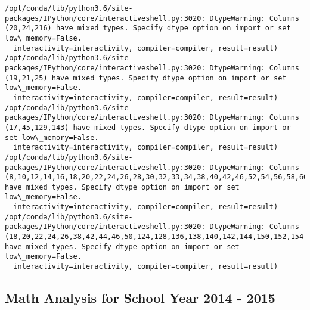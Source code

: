 \documentclass[11pt]{article}
\begin{document}
    \begin{Verbatim}[commandchars=\\\{\}]
/opt/conda/lib/python3.6/site-packages/IPython/core/interactiveshell.py:3020: DtypeWarning: Columns (20,24,216) have mixed types. Specify dtype option on import or set low\_memory=False.
  interactivity=interactivity, compiler=compiler, result=result)
/opt/conda/lib/python3.6/site-packages/IPython/core/interactiveshell.py:3020: DtypeWarning: Columns (19,21,25) have mixed types. Specify dtype option on import or set low\_memory=False.
  interactivity=interactivity, compiler=compiler, result=result)
/opt/conda/lib/python3.6/site-packages/IPython/core/interactiveshell.py:3020: DtypeWarning: Columns (17,45,129,143) have mixed types. Specify dtype option on import or set low\_memory=False.
  interactivity=interactivity, compiler=compiler, result=result)
/opt/conda/lib/python3.6/site-packages/IPython/core/interactiveshell.py:3020: DtypeWarning: Columns (8,10,12,14,16,18,20,22,24,26,28,30,32,33,34,38,40,42,46,52,54,56,58,60,62,64,68,70,72,74,76,78,80,82,84,86,88,90,92,94,96,98,100,102,104,106,108,110,112,114,116,118,120,122,124,126,128,130,132,134,136,138,140,142,144,146,148,150,152,154,156,158,162,164,166,168,170,172,174,178,180,182,186,196,200,202,206,208,210,214,216,217,218,219,220,221,222,223,224,225,226,227,228,229) have mixed types. Specify dtype option on import or set low\_memory=False.
  interactivity=interactivity, compiler=compiler, result=result)
/opt/conda/lib/python3.6/site-packages/IPython/core/interactiveshell.py:3020: DtypeWarning: Columns (18,20,22,24,26,38,42,44,46,50,124,128,136,138,140,142,144,150,152,154,162,170,178,182,190,192,234,236,244,246,248,252,254,256) have mixed types. Specify dtype option on import or set low\_memory=False.
  interactivity=interactivity, compiler=compiler, result=result)

    \end{Verbatim}

    \hypertarget{math-analysis-for-school-year-2014---2015}{%
\subsection{Math Analysis for School Year 2014 -
2015}\label{math-analysis-for-school-year-2014---2015}}
\end{document}
